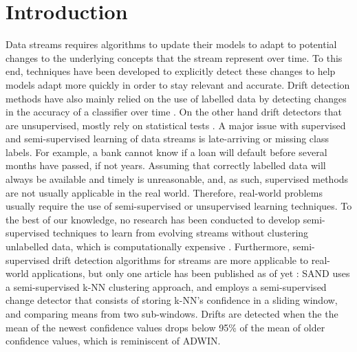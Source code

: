 \documentclass[runningheads]{llncs}
\begin{document}
\section{Introduction}

Data streams requires algorithms to update their models to adapt to potential changes to the underlying concepts that the stream represent over time. To this end, techniques have been developed to explicitly detect these changes to help models adapt more quickly in order to stay relevant and accurate. Drift detection methods have also mainly relied on the use of labelled data by detecting changes in the accuracy of a classifier over time \cite{bifet2007learning, gama2004learning}. On the other hand drift detectors that are unsupervised, mostly rely on statistical tests \cite{sobolewski2013concept}. A major issue with supervised and semi-supervised learning of data streams is late-arriving or missing class labels. For example, a bank cannot know if a loan will default before several months have passed, if not years. Assuming that correctly labelled data will always be available and timely is unreasonable, and, as such, supervised methods are not usually applicable in the real world. Therefore, real-world problems usually require the use of semi-supervised or unsupervised learning techniques. To the best of our knowledge, no research has been conducted to develop semi-supervised techniques to learn from evolving streams without clustering unlabelled data, which is computationally expensive \cite{krempl2014open}. Furthermore, semi-supervised drift detection algorithms for streams are more applicable to real-world applications, but only one article has been published as of yet \cite{haque2015sand}: SAND uses a semi-supervised k-NN clustering approach, and employs a semi-supervised change detector that consists of storing k-NN's confidence in a sliding window, and comparing means from two sub-windows. Drifts are detected when the the mean of the newest confidence values drops below 95\% of the mean of older confidence values, which is reminiscent of ADWIN.
\end{document}
